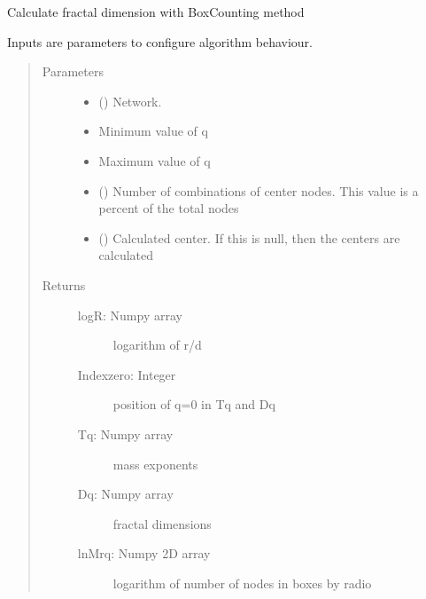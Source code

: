 \documentclass[letterpaper,10pt,english]{sphinxmanual}
\begin{document}
\begin{fulllineitems}
\label{\detokenize{BCAlgorithm:BCAlgorithm.BCAlgorithm.BCAlgorithm}}
Calculate fractal dimension with BoxCounting method

Inputs are parameters to configure algorithm behaviour.
\begin{quote}\begin{description}
\item[{Parameters}] \leavevmode\begin{itemize}
\item {} 
 () \textendash{} Network.

\item {} 
 \textendash{} Minimum value of q

\item {} 
 \textendash{} Maximum value of q

\item {} 
 () \textendash{} Number of combinations of center nodes. This value is a percent of the total nodes

\item {} 
 () \textendash{} Calculated center. If this is null, then the centers are calculated

\end{itemize}

\item[{Returns}] \leavevmode
\begin{description}
\item[{logR: Numpy array}] \leavevmode
logarithm of r/d

\item[{Indexzero: Integer}] \leavevmode
position of q=0 in Tq and Dq

\item[{Tq: Numpy array}] \leavevmode
mass exponents

\item[{Dq: Numpy array}] \leavevmode
fractal dimensions

\item[{lnMrq: Numpy 2D array}] \leavevmode
logarithm of number of nodes in boxes by radio

\end{description}


\end{description}\end{quote}

\end{fulllineitems}
\end{document}
